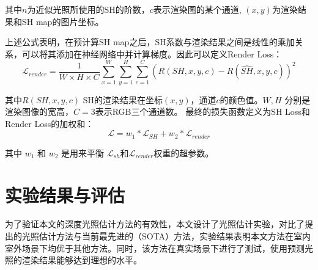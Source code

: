 其中$n$为近似光照所使用的SH的阶数，$c$表示渲染图的某个通道, $(x, y)$为渲染结果和SH map的图片坐标。

上述公式表明，在预计算SH map之后，SH系数与渲染结果之间是线性的乘加关系，可以将其添加在神经网络中并计算梯度。因此可以定义Render Loss：
\begin{equation}
    \mathcal{L}_{render} = \frac{1}{W\times H\times C} \sum_{x=1}^{W}\sum_{y=1}^{H}\sum_{c=1}^{C}(R(SH,x,y,c)-R(\hat{SH},x,y,c))^{2}
\end{equation}

其中$R(SH,x,y,c)$ SH的渲染结果在坐标$(x,y)$，通道$c$的颜色值。$W, H$ 分别是渲染图像的宽高，$C=3$表示RGB三个通道数。
最终的损失函数定义为SH Loss和Render Loss的加权和：
\begin{equation}
    \label{eq:loss-function}
    \mathcal{L} =w_{1}*\mathcal{L}_{SH}+w_{2}*\mathcal{L}_{render}
\end{equation}

 其中 $w_1$ 和 $w_2$ 是用来平衡 $\mathcal{L}_{sh}$和$\mathcal{L}_{render}$权重的超参数。
\section{实验结果与评估}\label{sec:experiment}
为了验证本文的深度光照估计方法的有效性，本文设计了光照估计实验，对比了提出的光照估计方法与当前最先进的（SOTA）方法，实验结果表明本文方法在室内室外场景下均优于其他方法。同时，该方法在真实场景下进行了测试，使用预测光照的渲染结果能够达到理想的水平。
